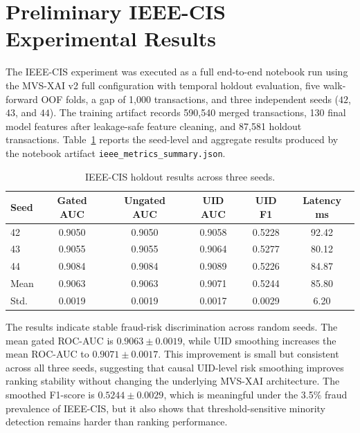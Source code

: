 \documentclass[10pt,a4paper,twocolumn]{article}
\begin{document}
\section{Preliminary IEEE-CIS Experimental Results}

The IEEE-CIS experiment was executed as a full end-to-end notebook run using the MVS-XAI v2 full configuration with temporal holdout evaluation, five walk-forward OOF folds, a gap of 1{,}000 transactions, and three independent seeds ($42$, $43$, and $44$). The training artifact records 590{,}540 merged transactions, 130 final model features after leakage-safe feature cleaning, and 87{,}581 holdout transactions. Table~\ref{tab:ieee_results} reports the seed-level and aggregate results produced by the notebook artifact \texttt{ieee\_metrics\_summary.json}.

\begin{table}[H]
\centering
\caption{IEEE-CIS holdout results across three seeds.}
\label{tab:ieee_results}
{\scriptsize
\setlength{\tabcolsep}{3pt}
\renewcommand{\arraystretch}{1.08}
\begin{tabularx}{\columnwidth}{@{}lccccc@{}}
\toprule
Seed & Gated AUC & Ungated AUC & UID AUC & UID F1 & Latency ms \\
\midrule
42 & 0.9050 & 0.9050 & 0.9058 & 0.5228 & 92.42 \\
43 & 0.9055 & 0.9055 & 0.9064 & 0.5277 & 80.12 \\
44 & 0.9084 & 0.9084 & 0.9089 & 0.5226 & 84.87 \\
\midrule
Mean & 0.9063 & 0.9063 & 0.9071 & 0.5244 & 85.80 \\
Std. & 0.0019 & 0.0019 & 0.0017 & 0.0029 & 6.20 \\
\bottomrule
\end{tabularx}
}
\end{table}

The results indicate stable fraud-risk discrimination across random seeds. The mean gated ROC-AUC is $0.9063 \pm 0.0019$, while UID smoothing increases the mean ROC-AUC to $0.9071 \pm 0.0017$. This improvement is small but consistent across all three seeds, suggesting that causal UID-level risk smoothing improves ranking stability without changing the underlying MVS-XAI architecture. The smoothed F1-score is $0.5244 \pm 0.0029$, which is meaningful under the 3.5\% fraud prevalence of IEEE-CIS, but it also shows that threshold-sensitive minority detection remains harder than ranking performance.
\end{document}
